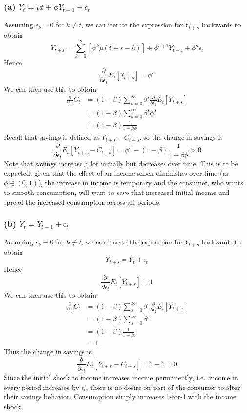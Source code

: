 \documentclass[11pt]{amsart}
\begin{document}
\subsubsection*{(a) $Y_t = \mu t + \phi Y_{t-1} + \epsilon_t$}
Assuming $\epsilon_k = 0$ for $k \neq t$, we can iterate the expression for $Y_{t+s}$ backwards to obtain
\[
Y_{t+s} = \sum_{k=0}^s \left[ \phi^k \mu (t+s-k) \right] + \phi^{s+1} Y_{t-1} + \phi^s \epsilon_t
\]
Hence
\[
\frac{\partial}{\partial \epsilon_t} E_t [Y_{t+s}] = \phi^s
\]
We can then use this to obtain
\begin{align*}
	\frac{\partial}{\partial \epsilon_t} C_t &= (1-\beta) \sum_{s=0}^\infty \beta^s \frac{\partial}{\partial \epsilon_t} E_t [Y_{t+s}] \\
	&= (1-\beta) \sum_{s=0}^\infty \beta^s \phi^s \\
	&= (1-\beta) \frac{1}{1-\beta \phi}
\end{align*}
Recall that savings is defined as $Y_{t+s} - C_{t+s}$, so the change in savings is
\[
\frac{\partial}{\partial \epsilon_t} E_t [Y_{t+s} - C_{t+s}] = \phi^s - (1-\beta) \frac{1}{1-\beta \phi} > 0
\]
Note that savings increase a lot initially but decreases over time. This is to be expected: given that the effect of an income shock diminishes over time (as $\phi \in (0,1)$), the increase in income is temporary and the consumer, who wants to smooth consumption, will want to save that increased initial income and spread the increased consumption across all periods.

\subsubsection*{(b) $Y_t = Y_{t-1} + \epsilon_t$}
Assuming $\epsilon_k = 0$ for $k \neq t$, we can iterate the expression for $Y_{t+s}$ backwards to obtain
\[
Y_{t+s} = Y_t + \epsilon_t
\]
Hence
\[
\frac{\partial}{\partial \epsilon_t} E_t [Y_{t+s}] = 1
\]
We can then use this to obtain
\begin{align*}
	\frac{\partial}{\partial \epsilon_t} C_t &= (1-\beta) \sum_{s=0}^\infty \beta^s \frac{\partial}{\partial \epsilon_t} E_t [Y_{t+s}] \\
	&= (1-\beta) \sum_{s=0}^\infty \beta^s \\
	&= (1-\beta) \frac{1}{1-\beta} \\
	&= 1
\end{align*}
Thus the change in savings is
\[
\frac{\partial}{\partial \epsilon_t} E_t [Y_{t+s} - C_{t+s}] = 1 - 1 = 0
\]
Since the initial shock to income increases income permanently, i.e., income in every period increases by $\epsilon_t$, there is no desire on part of the consumer to alter their savings behavior. Consumption simply increases 1-for-1 with the income shock.
\end{document}
